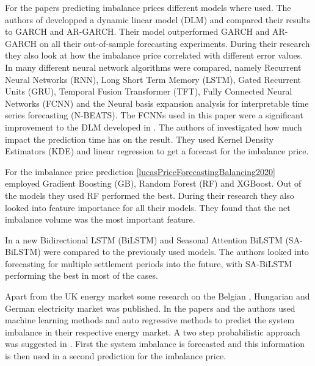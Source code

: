 \documentclass[class=scrbook, crop=false]{standalone}
\begin{document}
For the papers predicting imbalance prices different models where used.
The authors of \cite{limaBayesianPredictiveDistributions2023} developped a dynamic linear model (DLM) and compared their results to GARCH and AR-GARCH. Their model outperformed GARCH and AR-GARCH on all their out-of-sample forecasting experiments. During their research they also look at how the imbalance price correlated with different error values.
In \cite{ganeshForecastingImbalancePrice2024} many different neural network algorithms were compared, namely Recurrent Neural Networks (RNN), Long Short Term Memory (LSTM), Gated Recurrent Units (GRU), Temporal Fusion Transformer (TFT), Fully Connected Neural Networks (FCNN) and the Neural basis expansion analysis for interpretable time series forecasting (N-BEATS). The FCNNs used in this paper were a significant improvement to the DLM developed in \cite{limaBayesianPredictiveDistributions2023}.
The authors of \cite{browellPredictingElectricityImbalance2022} investigated how much impact the prediction time has on the result. They used Kernel Density Estimators (KDE) and linear regression to get a forecast for the imbalance price. 
 
 For the imbalance price prediction \ref{lucasPriceForecastingBalancing2020} employed Gradient Boosting (GB), Random Forest (RF) and XGBoost. Out of the models they used RF performed the best. During their research they also looked into feature importance for all their models. They found that the net imbalance volume was the most important feature.
 
 In \cite{dengSeasonalityDeepLearning2024} a new Bidirectional LSTM (BiLSTM) and Seasonal Attention BiLSTM (SA-BiLSTM) were compared to the previously used models. The authors looked into forecasting for multiple settlement periods into the future, with SA-BiLSTM performing the best in most of the cases.
 
Apart from the UK energy market some research on the Belgian \cite{bottieauVeryShortTermProbabilisticForecasting2020} \cite{dumasProbabilisticForecastingImbalance2019}, Hungarian \cite{balazsShorttermSystemImbalance2024} and German \cite{narajewskiProbabilisticForecastingGerman2022} electricity market was published.
In the papers \cite{bottieauVeryShortTermProbabilisticForecasting2020} and \cite{balazsShorttermSystemImbalance2024} the authors used machine learning methods and auto regressive methods to predict the system imbalance in their respective energy market.
A two step probabilistic approach was suggested in \cite{dumasProbabilisticForecastingImbalance2019}. First the system imbalance is forecasted and this information is then used in a second prediction for the imbalance price.
\end{document}
